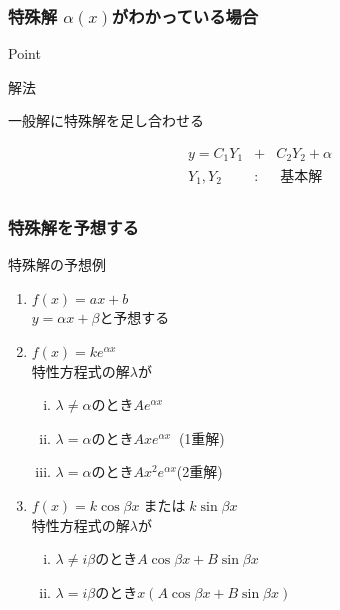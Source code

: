 \documentclass[a4paper]{jsarticle}
\begin{document}
\subsubsection{特殊解 $\alpha\left(x\right)$がわかっている場合}
\begin{itembox}[l]{Point}
    \begin{center}
    \end{center}
\end{itembox}
\begin{itembox}[l]{解法}
    \begin{center}
        一般解に特殊解を足し合わせる
    \end{center}
    \begin{eqnarray*}
        y=C_1Y_1&+&C_2Y_2+\alpha\\
        Y_1,Y_2\;&:&\;基本解\\
    \end{eqnarray*}
\end{itembox}
\subsubsection{特殊解を予想する}
\begin{itembox}[l]{特殊解の予想例}
    \begin{enumerate}[(1)]
        \item $f\left(x\right)=ax+b$\\
              $y=\alpha x + \beta$と予想する
        \item $f\left(x\right)=ke^{\alpha x}$\\
              特性方程式の解$\lambda$が
              \begin{enumerate}[(i)]
                  \item $\lambda \neq \alpha$\quad のとき\quad$Ae^{\alpha x}$
                  \item $\lambda = \alpha$\quad のとき\quad$Axe^{\alpha x}\;\;$\quad(1重解)
                  \item $\lambda = \alpha$\quad のとき\quad$Ax^2e^{\alpha x}$\quad(2重解)
              \end{enumerate}
        \item $f\left(x\right)=k\cos\beta x\;$または$\;k\sin\beta x$\\
              特性方程式の解$\lambda$が
              \begin{enumerate}[(i)]
                  \item $\lambda \neq i\beta$\quad のとき\quad$A\cos\beta x+B\sin\beta x$
                  \item $\lambda = i\beta$\quad のとき\quad$x\left(A\cos\beta x+B\sin\beta x\right)$
              \end{enumerate}
    \end{enumerate}
\end{itembox}
\end{document}
